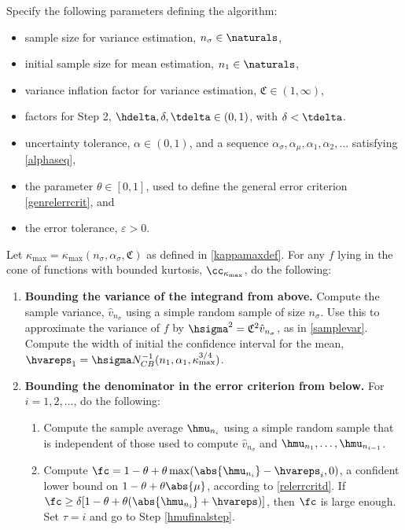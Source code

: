 \documentclass[graybox]{svmult}
\newcommand{\hv}{\hat{v}}
\newcommand{\fudge}{\mathfrak{C}}
\begin{document}
\begin{theorem} \label{relerradaptthm} Specify the following parameters defining the algorithm:
\begin{itemize}
\item sample size for variance estimation, $n_{\sigma} \in \naturals$,
\item initial sample size for mean estimation, $n_1 \in \naturals$,
\item variance inflation factor for variance estimation, $\fudge \in (1,\infty)$, 
\item factors for Step 2, $\hdelta, \delta, \tdelta \in (0,1)$, with $\delta < \tdelta$.
\item uncertainty tolerance, $\alpha\in (0,1)$, and a sequence $\alpha_{\sigma}, \alpha_{\mu}, \alpha_1,  \alpha_2, \ldots$ satisfying \eqref{alphaseq}, 
\item the parameter $\theta \in [0,1]$, used to define the general error criterion \eqref{genrelerrcrit}, and
\item the error tolerance, $\varepsilon >0$. 
\end{itemize} 
Let $\kappa_{\max}=\kappa_{\max}(n_{\sigma},\alpha_{\sigma},\fudge)$ as defined in \eqref{kappamaxdef}.  For any $f$ lying in the cone of functions with bounded kurtosis, $\cc_{\kappa_{\max}}$, do the following:
\begin{enumerate}
\item {\bf Bounding the variance of the integrand from above.} Compute the sample variance, $\hv_{n_{\sigma}}$ using a simple random sample of size $n_{\sigma}$. Use this to approximate the variance of $f$ by $\hsigma^2 = \fudge^2 \hv_{n_{\sigma}}$, as in \eqref{samplevar}. Compute the width of initial the confidence interval for the mean, $\hvareps_1=\hsigma N_{CB}^{-1}(n_1,\alpha_1,\kappa_{\max}^{3/4})$.

\item \label{boundcstep} {\bf Bounding the denominator in the error criterion  from below.} For $i=1, 2, \ldots$, do the following:

\begin{enumerate}

\item Compute the sample average $\hmu_{n_i}$ using a simple random sample that is independent of those used to compute $\hv_{n_{\sigma}}$ and $\hmu_{n_1}, \ldots, \hmu_{n_{i-1}}$.

\item Compute $\fc=1-\theta + \theta\max(\abs{\hmu_{n_i}}-\hvareps_{i},0)$, a confident lower bound on $1-\theta + \theta\abs{\mu}$, according to \eqref{relerrcritd}.  If $\fc \ge \delta [1 - \theta + \theta(\abs{\hmu_{n_i}} + \hvareps)]$, then $\fc$ is large enough.  Set $\tau=i$ and go to Step \ref{hmufinalstep}.


\end{enumerate}
\end{enumerate}
\end{theorem}
\end{document}
